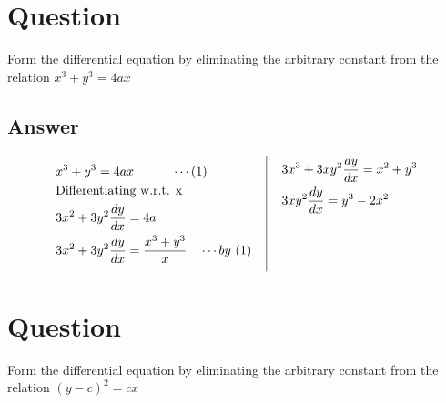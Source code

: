 \documentclass[17pt]{extarticle}
\begin{document}
\noindent
\begin{fleqn} 


\section{Question} 
Form the differential equation by eliminating the arbitrary constant from the relation $ x^3 + y^3 = 4ax$

\subsection*{Answer}
\begin{equation} \nonumber
\begin{alignedat}{4}
&  x^3 + y^3 = 4ax  \quad\quad\quad \cdots (1)  \\
& \text{Differentiating w.r.t. x \ }\\
& 3x^2 + 3y^2 \frac{dy}{dx}= 4a \\
& 3x^2 + 3y^2\frac{dy}{dx}= \frac{x^3+y^3}{x} \quad \cdots by \ (1) \quad \\
\end{alignedat}
\,
\vrule
\quad
\, 
\begin{alignedat}{4}
& 3x^3 + 3xy^2\frac{dy}{dx}=  x^2+y^3\\
& 3xy^2\frac{dy}{dx}=  y^3-2x^2\\& \\
& \\
& \\
\end{alignedat}
\end{equation}

\section{Question} 
Form the differential equation by eliminating the arbitrary constant from the relation $ (y-c)^2 = cx $


\end{fleqn}
\end{document}
